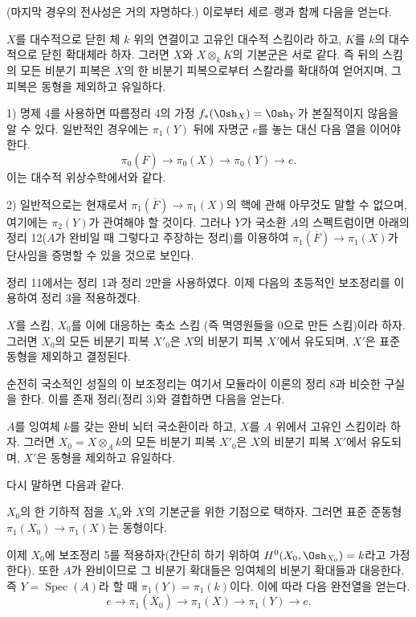 (마지막 경우의 전사성은 거의 자명하다.) 이로부터 세르--랭과 함께 다음을
얻는다.

 $X$를 대수적으로 닫힌 체 $k$ 위의 연결이고 고유인
대수적 스킴이라 하고, $K$를 $k$의 대수적으로 닫힌 확대체라 하자. 그러면
$X$와 $X\otimes_kK$의 기본군은 서로 같다. 즉 뒤의 스킴의 모든 비분기
피복은 $X$의 한 비분기 피복으로부터 스칼라를 확대하여 얻어지며, 그 피복은
동형을 제외하고 유일하다.


1) 명제 4를 사용하면 따름정리 4의 가정 $f_*(\Osh_X)=\Osh_Y$가 본질적이지
않음을 알 수 있다. 일반적인 경우에는 $\pi_1(Y)$ 뒤에 자명군 $e$를 놓는
대신 다음 열을 이어야 한다.
\[
  \pi_0(\overline F)\longrightarrow\pi_0(X)
  \longrightarrow\pi_0(Y)\longrightarrow e.
\]
이는 대수적 위상수학에서와 같다.

2) 일반적으로는 현재로서
$\pi_1(\overline F)\longrightarrow\pi_1(X)$의 핵에 관해 아무것도 말할 수
없으며, 여기에는 $\pi_2(Y)$가 관여해야 할 것이다. 그러나 $Y$가 국소환
$A$의 스펙트럼이면 아래의 정리 12($A$가 완비일 때 그렇다고 주장하는
정리)를 이용하여 $\pi_1(\overline F)\longrightarrow\pi_1(X)$가 단사임을
증명할 수 있을 것으로 보인다.

정리 11에서는 정리 1과 정리 2만을 사용하였다. 이제 다음의 초등적인
보조정리를 이용하여 정리 3을 적용하겠다.

 $X$를 스킴, $X_0$를 이에 대응하는 축소 스킴
(즉 멱영원들을 0으로 만든 스킴)이라 하자. 그러면 $X_0$의 모든 비분기
피복 $X'_0$은 $X$의 비분기 피복 $X'$에서 유도되며, $X'$은 표준 동형을
제외하고 결정된다.

순전히 국소적인 성질의 이 보조정리는 여기서 모듈라이 이론의 정리 8과
비슷한 구실을 한다. 이를 존재 정리(정리 3)와 결합하면 다음을 얻는다.

 $A$를 잉여체 $k$를 갖는 완비 뇌터 국소환이라 하고,
$X$를 $A$ 위에서 고유인 스킴이라 하자. 그러면
$X_0=X\otimes_A k$의 모든 비분기 피복 $X'_0$은 $X$의 비분기 피복
$X'$에서 유도되며, $X'$은 동형을 제외하고 유일하다.

다시 말하면 다음과 같다.

 $X_0$의 한 기하적 점을 $X_0$와 $X$의 기본군을 위한
기점으로 택하자. 그러면 표준 준동형
$\pi_1(X_0)\longrightarrow\pi_1(X)$는 동형이다.

이제 $X_0$에 보조정리 5를 적용하자(간단히 하기 위하여
$H^0(X_0,\Osh_{X_0})=k$라고 가정한다). 또한 $A$가 완비이므로 그 비분기
확대들은 잉여체의 비분기 확대들과 대응한다. 즉
$Y=\operatorname{Spec}(A)$라 할 때 $\pi_1(Y)=\pi_1(k)$이다. 이에 따라
다음 완전열을 얻는다.
\[
  e\longrightarrow\pi_1(\overline X_0)
  \longrightarrow\pi_1(X)\longrightarrow\pi_1(Y)\longrightarrow e.
\]

